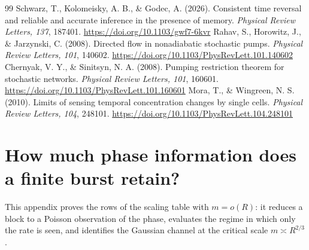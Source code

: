 \documentclass[11pt,a4paper]{article}
\begin{document}
\begin{thebibliography}{99}
 Schwarz, T., Kolomeisky, A. B., \& Godec, A. (2026). Consistent time reversal and reliable and accurate inference in the presence of memory. \emph{Physical Review Letters, 137}, 187401. \url{https://doi.org/10.1103/gwf7-6kvr}
 Rahav, S., Horowitz, J., \& Jarzynski, C. (2008). Directed flow in nonadiabatic stochastic pumps. \emph{Physical Review Letters, 101}, 140602. \url{https://doi.org/10.1103/PhysRevLett.101.140602}
 Chernyak, V. Y., \& Sinitsyn, N. A. (2008). Pumping restriction theorem for stochastic networks. \emph{Physical Review Letters, 101}, 160601. \url{https://doi.org/10.1103/PhysRevLett.101.160601}
 Mora, T., \& Wingreen, N. S. (2010). Limits of sensing temporal concentration changes by single cells. \emph{Physical Review Letters, 104}, 248101. \url{https://doi.org/10.1103/PhysRevLett.104.248101}
\end{thebibliography}

\appendix
\section{How much phase information does a finite burst retain?}\label{app:short}
This appendix proves the rows of the scaling table with $m=o(R)$: it reduces a block to a Poisson observation of the phase, evaluates the regime in which only the rate is seen, and identifies the Gaussian channel at the critical scale $m\asymp R^{2/3}$.





\end{document}
